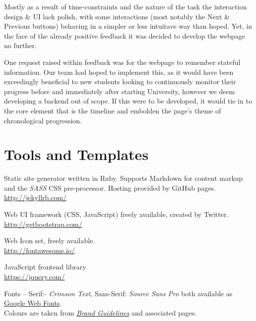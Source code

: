 \documentclass[a4paper, notoc]{tufte-handout}
\let\origdescription\description
\renewenvironment{description}{
  \setlength{\leftmargini}{1.5em}
  \origdescription
  \setlength{\itemindent}{-1.5em}
  \setlength{\labelsep}{\textwidth}
}
{\endlist}
\begin{document}
Mostly as a result of time-constraints and the nature of the task the interaction design \& UI lack 
polish, with some interactions (most notably the Next \& Previous buttons) behaving in a simpler 
or less intuitave way than hoped. Yet, in the face of the already positive feedback it was 
decided to develop the webpage no further.

One request raised within feedback was for the webpage to remember stateful information. Our 
team had hoped to implement this, as it would have been exceedingly beneficial to new students 
looking to continuously monitor their progress before and immediately after starting University, 
however we deem developing a backend out of scope. If this were to be developed, it would tie 
in to the core element that is the timeline and embolden the page's theme of chronological progression.


\section{Tools and Templates}


\begin{description}

\item[Jekyll]
Static site generator written in Ruby. Supports Markdown for 
content markup and the \textit{SASS} CSS pre-processor.
Hosting provided by GitHub pages.
\\
\href{http://jekyllrb.com/}{http://jekyllrb.com/}

\item[BootStrap]
Web UI framework (CSS, JavaScript) freely available, created by Twitter.
\\
\href{http://getbootstrap.com/}{http://getbootstrap.com/}

\item[FontAwesome]
Web Icon set, freely available.
\\
\href{http://fontawesome.io/}{http://fontawesome.io/}


\item[JQuery]
JavaScript frontend library
\\
\href{https://jquery.com/}{https://jquery.com/}

\item[University of Edinburgh Style Guide]
Fonts -- Serif:- \textit{Crimson Text}, Sans-Serif: \textit{Source Sans Pro} both 
available as \href{https://fonts.google.com/}{Google Web Fonts}.
\\
Colours are taken from 
\href{http://www.ed.ac.uk/communications-marketing/resources}{\textit{Brand Guidelines}} 
and associated pages.
\\



\end{description}
\end{document}
